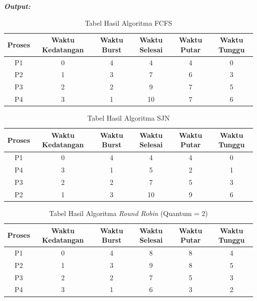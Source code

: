 \documentclass[12pt]{article}
\begin{document}
\textbf{\textit{Output:}}
\begin{table}[h!]
    \centering
    \begin{tabular}{|c|c|c|c|c|c|}
        \hline
        Proses & Waktu Kedatangan & Waktu Burst & Waktu Selesai & Waktu Putar & Waktu Tunggu \\
        \hline
        P1 & 0 & 4 & 4 & 4 & 0 \\
        \hline
        P2 & 1 & 3 & 7 & 6 & 3 \\
        \hline
        P3 & 2 & 2 & 9 & 7 & 5 \\
        \hline
        P4 & 3 & 1 & 10 & 7 & 6 \\
        \hline
    \end{tabular}
    \caption{Tabel Hasil Algoritma FCFS}
\end{table}

\begin{table}[h!]
    \centering
    \begin{tabular}{|c|c|c|c|c|c|}
        \hline
        Proses & Waktu Kedatangan & Waktu Burst & Waktu Selesai & Waktu Putar & Waktu Tunggu \\
        \hline
        P1 & 0 & 4 & 4 & 4 & 0 \\
        \hline
        P4 & 3 & 1 & 5 & 2 & 1 \\
        \hline
        P3 & 2 & 2 & 7 & 5 & 3 \\
        \hline
        P2 & 1 & 3 & 10 & 9 & 6 \\
        \hline
    \end{tabular}
    \caption{Tabel Hasil Algoritma SJN}
\end{table}

\begin{table}[h!]
    \centering
    \begin{tabular}{|c|c|c|c|c|c|}
        \hline
        Proses & Waktu Kedatangan & Waktu Burst & Waktu Selesai & Waktu Putar & Waktu Tunggu \\
        \hline
        P1 & 0 & 4 & 8 & 8 & 4 \\
        \hline
        P2 & 1 & 3 & 9 & 8 & 5 \\
        \hline
        P3 & 2 & 2 & 7 & 5 & 3 \\
        \hline
        P4 & 3 & 1 & 6 & 3 & 2 \\
        \hline
    \end{tabular}
    \caption{Tabel Hasil Algoritma \textit{Round Robin} (Quantum = 2)}
\end{table}
\end{document}
